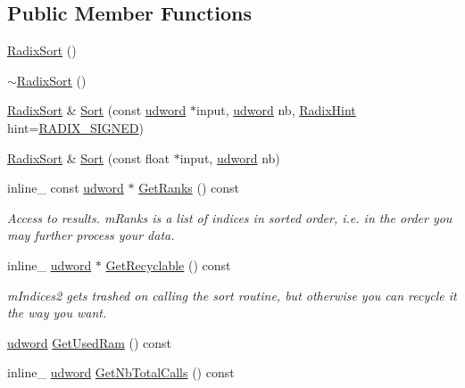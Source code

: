 \subsection*{Public Member Functions}
\begin{DoxyCompactItemize}
\item 
\hyperlink{classRadixSort_a92fec8f9bb15493736ca119f92fbaea9}{Radix\+Sort} ()
\item 
\hyperlink{classRadixSort_ac477ade290104f955836b4750c521cb6}{$\sim$\+Radix\+Sort} ()
\item 
\hyperlink{classRadixSort}{Radix\+Sort} \& \hyperlink{classRadixSort_a815a222b3f7d555bf741bff989a32d27}{Sort} (const \hyperlink{IceTypes_8h_a44c6f1920ba5551225fb534f9d1a1733}{udword} $\ast$input, \hyperlink{IceTypes_8h_a44c6f1920ba5551225fb534f9d1a1733}{udword} nb, \hyperlink{IceRevisitedRadix_8h_acf223d4d688c445c2088d9b2d9aee8d0}{Radix\+Hint} hint=\hyperlink{IceRevisitedRadix_8h_acf223d4d688c445c2088d9b2d9aee8d0a91fa3afcca04aadade3caad8b46d511b}{R\+A\+D\+I\+X\+\_\+\+S\+I\+G\+N\+ED})
\item 
\hyperlink{classRadixSort}{Radix\+Sort} \& \hyperlink{classRadixSort_a07ce3c442cb8443012cab92f94351246}{Sort} (const float $\ast$input, \hyperlink{IceTypes_8h_a44c6f1920ba5551225fb534f9d1a1733}{udword} nb)
\item 
inline\+\_\+ const \hyperlink{IceTypes_8h_a44c6f1920ba5551225fb534f9d1a1733}{udword} $\ast$ \hyperlink{classRadixSort_a705769648fdad72220225ca543b18f2d}{Get\+Ranks} () const \hypertarget{classRadixSort_a705769648fdad72220225ca543b18f2d}{}\label{classRadixSort_a705769648fdad72220225ca543b18f2d}

\begin{DoxyCompactList}\small\item\em Access to results. m\+Ranks is a list of indices in sorted order, i.\+e. in the order you may further process your data. \end{DoxyCompactList}\item 
inline\+\_\+ \hyperlink{IceTypes_8h_a44c6f1920ba5551225fb534f9d1a1733}{udword} $\ast$ \hyperlink{classRadixSort_a953a9429075bb3350b1d372972ca0d30}{Get\+Recyclable} () const \hypertarget{classRadixSort_a953a9429075bb3350b1d372972ca0d30}{}\label{classRadixSort_a953a9429075bb3350b1d372972ca0d30}

\begin{DoxyCompactList}\small\item\em m\+Indices2 gets trashed on calling the sort routine, but otherwise you can recycle it the way you want. \end{DoxyCompactList}\item 
\hyperlink{IceTypes_8h_a44c6f1920ba5551225fb534f9d1a1733}{udword} \hyperlink{classRadixSort_afc66aa956bc2e5078697d75436f9553b}{Get\+Used\+Ram} () const 
\item 
inline\+\_\+ \hyperlink{IceTypes_8h_a44c6f1920ba5551225fb534f9d1a1733}{udword} \hyperlink{classRadixSort_a3872636cd420e073d23b247bc00fa818}{Get\+Nb\+Total\+Calls} () const \hypertarget{classRadixSort_a3872636cd420e073d23b247bc00fa818}{}\label{classRadixSort_a3872636cd420e073d23b247bc00fa818}


\end{DoxyCompactItemize}

